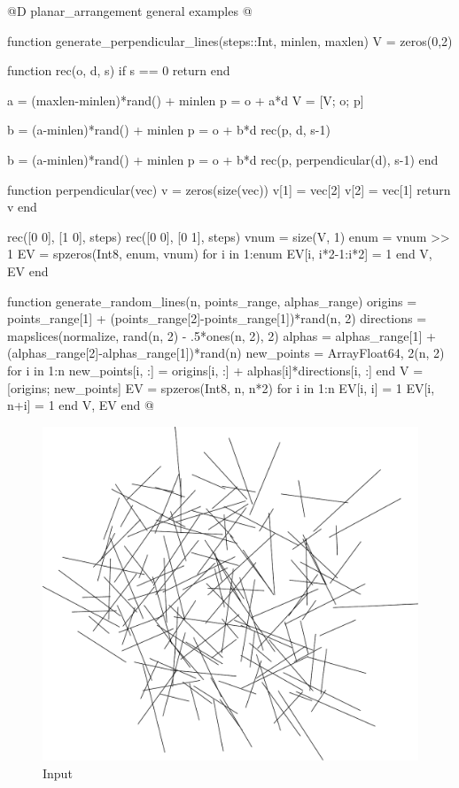 @D planar\_arrangement general examples
@{function generate_perpendicular_lines(steps::Int, minlen, maxlen)
    V = zeros(0,2)

    function rec(o, d, s)
        if s == 0 return end

        a = (maxlen-minlen)*rand() + minlen
        p = o + a*d
        V = [V; o; p]

        b = (a-minlen)*rand() + minlen
        p = o + b*d
        rec(p, d, s-1)

        b = (a-minlen)*rand() + minlen
        p = o + b*d
        rec(p, perpendicular(d), s-1)
    end

    function perpendicular(vec)
        v = zeros(size(vec))
        v[1] = vec[2]
        v[2] = vec[1]
        return v
    end

    rec([0 0], [1 0], steps)
    rec([0 0], [0 1], steps)
    vnum = size(V, 1)
    enum = vnum >> 1
    EV = spzeros(Int8, enum, vnum)
    for i in 1:enum
        EV[i, i*2-1:i*2] = 1
    end
    V, EV
end


function generate_random_lines(n, points_range, alphas_range)
    origins = points_range[1] + (points_range[2]-points_range[1])*rand(n, 2)
    directions = mapslices(normalize, rand(n, 2) - .5*ones(n, 2), 2)
    alphas = alphas_range[1] + (alphas_range[2]-alphas_range[1])*rand(n)
    new_points = Array{Float64, 2}(n, 2)
    for i in 1:n
        new_points[i, :] = origins[i, :] + alphas[i]*directions[i, :]
    end
    V = [origins; new_points]
    EV = spzeros(Int8, n, n*2)
    for i in 1:n
        EV[i, i] = 1
        EV[i, n+i] = 1
    end
    V, EV
end
@}

\vfill

\begin{figure}[p!]
    \includegraphics[width=\textwidth]{./img/test-lines.pdf}%
    \caption{Input}
\end{figure}



